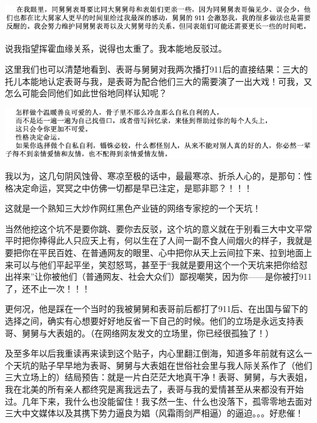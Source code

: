 \documentclass[9pt, b5paper]{article}
\begin{document}
\begin{center}
\includegraphics[width=.9\linewidth]{./pic/backups_plans_20210413_143433.png}
\end{center}

说我指望挥霍血缘关系，说得也太重了。我本能地反驳过。 

这里我们也可以清楚地看到、表哥与舅舅对我两次播打911后的直接结果：三大的托儿本能地认定表哥与我，是表哥为配合他们三大的需要演了一出大戏！可我，又怎么可能会同他们如此世俗地同样认知呢？

\begin{center}
\includegraphics[width=.9\linewidth]{./pic/backups_plans_20210413_131623.png}
\end{center}

我以为，这几句阴风蚀骨、寒凉至极的话中，最最寒凉、折杀人心的，是那句：性格决定命运，冥冥之中仿佛一切都是早已注定，是耶非耶？！！！

这就是一个熟知三大炒作网红黑色产业链的网络专家挖的一个天坑！

当然他挖这个坑不是要你跳、要你去反驳，这个坑的意义就在于别看三大中文平常平时把你捧得此人只应天上有，何以生在了人间一副不食人间烟火的样子，我就是要把你在平民百姓、在普通网友的眼里、心中把你从天上云间拉下来、拉到地面上来可以与他们平起平坐，笑怼怒骂，甚至于“我就是要用这个一个天坑来把你给怼出祥来”让你被他们（普通网友、社会大众们）鄙视嘲笑，因为你——是你被打911了，还不止一次！！！

更何况，他是踩在一个当时的我被舅舅和表哥前后都打了911后、在出国与留下的选择之间，确实有心想要好好地反省一下自己的时候。他们的立场是永远支持表哥、舅舅与大表姐的。（在网络网友发文的立场里，你已经很孤独了！）

及至多年以后我重读再来读到这个贴子，内心里翻江倒海，知道多年前就有这么一个天坑的贴子早早地为表哥、舅舅与大表姐在世俗社会里与我人际关系作了（他们三大立场上的）结局预告：就是一片白茫茫大地真干净！表哥、舅舅，与大表姐，我在北美的所有亲人都终究是离我远去了，表哥与我的爱情甚至从来都没有开始过。几年下来，我什么也没能留住！我孓然一生、什么也没落下，孤零零地去面对三大中文媒体以及其携下势力逼良为娼（风霜雨剑严相逼）的逼迫。。。好悲催！
\end{document}
